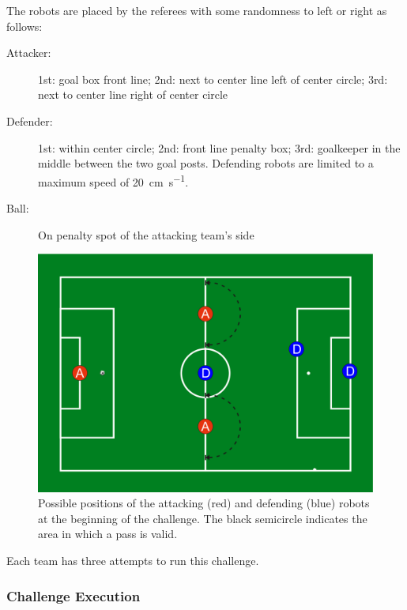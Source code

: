         The robots are placed by the referees with some randomness to left or right as follows:

        \begin{description}
            \item[Attacker:] 1st: goal box front line; 2nd: next to center line left of center circle; 3rd: next to center line right of center circle
            \item[Defender:] 1st: within center circle; 2nd: front line penalty box; 3rd: goalkeeper in the middle between the two goal posts. Defending robots are limited to a maximum speed of \qty{20}{\cm \per \second}.
            \item[Ball:] On penalty spot of the attacking team's side
        \end{description}

        \begin{figure}[t!]
            \begin{center}
                \leavevmode
                \includegraphics[width=1\columnwidth]{figs/ball_handling_positions.pdf}
                \caption{Possible positions of the attacking (red) and defending (blue) robots at the beginning of the challenge. The black semicircle indicates the area in which a pass is valid.}
                \label{fig:ball_handling_positions}
            \end{center}
        \end{figure}

    Each team has three attempts to run this challenge.

    \subsubsection{Challenge Execution}

